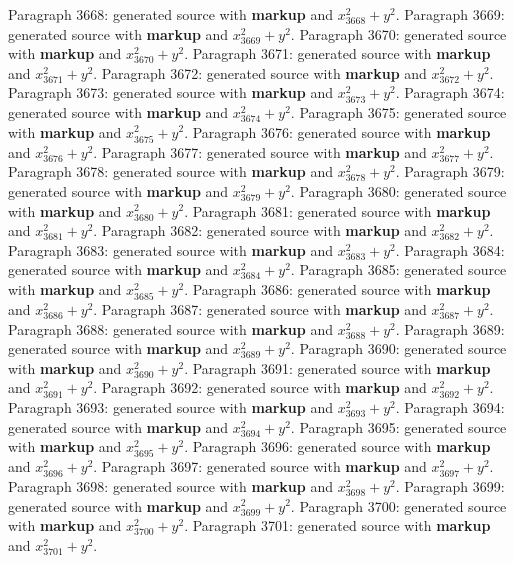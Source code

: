 \documentclass{article}
\begin{document}
Paragraph 3668: generated source with \textbf{markup} and $x_{3668}^2 + y^2$.
Paragraph 3669: generated source with \textbf{markup} and $x_{3669}^2 + y^2$.
Paragraph 3670: generated source with \textbf{markup} and $x_{3670}^2 + y^2$.
Paragraph 3671: generated source with \textbf{markup} and $x_{3671}^2 + y^2$.
Paragraph 3672: generated source with \textbf{markup} and $x_{3672}^2 + y^2$.
Paragraph 3673: generated source with \textbf{markup} and $x_{3673}^2 + y^2$.
Paragraph 3674: generated source with \textbf{markup} and $x_{3674}^2 + y^2$.
Paragraph 3675: generated source with \textbf{markup} and $x_{3675}^2 + y^2$.
Paragraph 3676: generated source with \textbf{markup} and $x_{3676}^2 + y^2$.
Paragraph 3677: generated source with \textbf{markup} and $x_{3677}^2 + y^2$.
Paragraph 3678: generated source with \textbf{markup} and $x_{3678}^2 + y^2$.
Paragraph 3679: generated source with \textbf{markup} and $x_{3679}^2 + y^2$.
Paragraph 3680: generated source with \textbf{markup} and $x_{3680}^2 + y^2$.
Paragraph 3681: generated source with \textbf{markup} and $x_{3681}^2 + y^2$.
Paragraph 3682: generated source with \textbf{markup} and $x_{3682}^2 + y^2$.
Paragraph 3683: generated source with \textbf{markup} and $x_{3683}^2 + y^2$.
Paragraph 3684: generated source with \textbf{markup} and $x_{3684}^2 + y^2$.
Paragraph 3685: generated source with \textbf{markup} and $x_{3685}^2 + y^2$.
Paragraph 3686: generated source with \textbf{markup} and $x_{3686}^2 + y^2$.
Paragraph 3687: generated source with \textbf{markup} and $x_{3687}^2 + y^2$.
Paragraph 3688: generated source with \textbf{markup} and $x_{3688}^2 + y^2$.
Paragraph 3689: generated source with \textbf{markup} and $x_{3689}^2 + y^2$.
Paragraph 3690: generated source with \textbf{markup} and $x_{3690}^2 + y^2$.
Paragraph 3691: generated source with \textbf{markup} and $x_{3691}^2 + y^2$.
Paragraph 3692: generated source with \textbf{markup} and $x_{3692}^2 + y^2$.
Paragraph 3693: generated source with \textbf{markup} and $x_{3693}^2 + y^2$.
Paragraph 3694: generated source with \textbf{markup} and $x_{3694}^2 + y^2$.
Paragraph 3695: generated source with \textbf{markup} and $x_{3695}^2 + y^2$.
Paragraph 3696: generated source with \textbf{markup} and $x_{3696}^2 + y^2$.
Paragraph 3697: generated source with \textbf{markup} and $x_{3697}^2 + y^2$.
Paragraph 3698: generated source with \textbf{markup} and $x_{3698}^2 + y^2$.
Paragraph 3699: generated source with \textbf{markup} and $x_{3699}^2 + y^2$.
Paragraph 3700: generated source with \textbf{markup} and $x_{3700}^2 + y^2$.
Paragraph 3701: generated source with \textbf{markup} and $x_{3701}^2 + y^2$.
\end{document}
